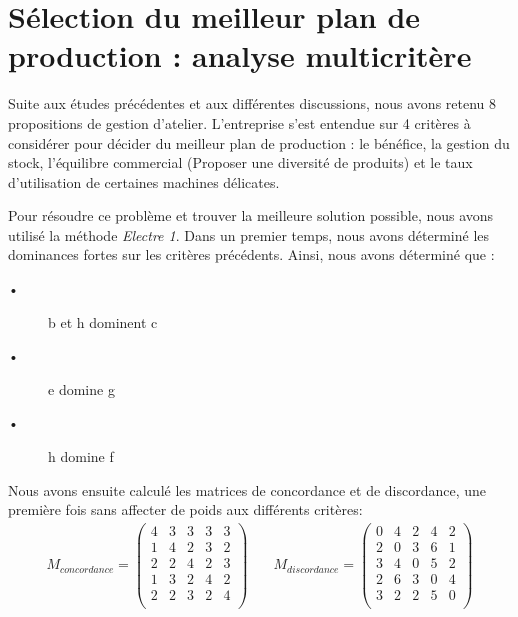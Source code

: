 \documentclass[12pt]{article}
\begin{document}
\section{Sélection du meilleur plan de production : analyse multicritère}
Suite aux études précédentes et aux différentes discussions, nous avons retenu 8 propositions de gestion d'atelier.
L'entreprise s'est entendue sur 4 critères à considérer pour décider du meilleur plan de production : le bénéfice, la gestion du stock, l'équilibre commercial (Proposer une diversité de produits) et le taux d'utilisation de certaines machines délicates.

Pour résoudre ce problème et trouver la meilleure solution possible, nous avons utilisé la méthode \emph{Electre 1}.
Dans un premier temps, nous avons déterminé les dominances fortes sur les critères précédents. Ainsi, nous avons déterminé que :
\begin{description}
\item[•]b et h dominent c
\item[•] e domine g
\item[•] h domine f
\end{description}
Nous avons ensuite calculé les matrices de concordance et de discordance, une première fois sans affecter de poids aux différents critères:
\begin{align*}
M_{concordance} =
 \begin{pmatrix}
  4	&3	&3	&3	&3\\
  1	&4	&2	&3	&2\\
  2	&2	&4	&2	&3\\
  1	&3	&2	&4	&2\\
  2	&2	&3	&2	&4\\
 \end{pmatrix}& \quad
 M_{discordance} =
 \begin{pmatrix}
  0	&4	&2	&4	&2\\
  2	&0	&3	&6	&1\\
  3	&4	&0	&5	&2\\
  2	&6	&3	&0	&4\\
  3	&2	&2	&5	&0\\
 \end{pmatrix}
\end{align*} 
\end{document}
